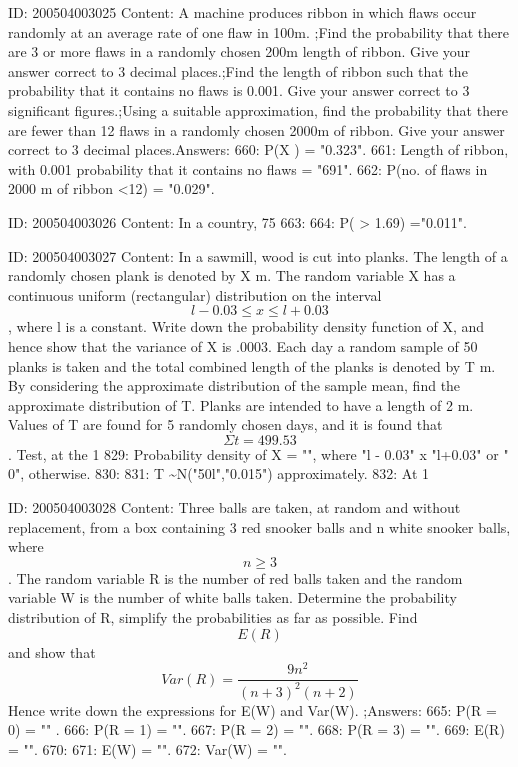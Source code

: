 \documentclass{article}
\begin{document}
ID: 200504003025
Content:
A machine produces ribbon in which flaws occur randomly at an average rate of one flaw in 100m. ;Find the probability that there are 3 or more flaws in a randomly chosen 200m length of ribbon. Give your answer correct to 3 decimal places.;Find the length of ribbon such that the probability that it contains no flaws is 0.001. Give your answer correct to 3 significant figures.;Using a suitable approximation, find the probability that there are fewer than 12 flaws in a randomly chosen 2000m of ribbon. Give your answer correct to 3 decimal places.Answers:
660: P(X ) = "0.323".
661: Length of ribbon, with 0.001 probability that it contains no flaws = "691".
662: P(no. of flaws in 2000 m of ribbon <12) = "0.029".

ID: 200504003026
Content:
In a country, 75%
663: 
664: P( > 1.69) ="0.011".

ID: 200504003027
Content:
In a sawmill, wood is cut into planks. The length of a randomly chosen plank is denoted by X m. The random variable X has a continuous uniform (rectangular) distribution on the interval $$l - 0.03 \leq x \leq l + 0.03$$, where l is a constant. Write down the probability density function of X, and hence show that the variance of X is .0003. Each day a random sample of 50 planks is taken and the total combined length of the planks is denoted by T m. By considering the approximate distribution of the sample mean, find the approximate distribution of T. Planks are intended to have a length of 2 m. Values of T are found for 5 randomly chosen days, and it is found that $$\Sigma t = 499.53$$. Test, at the 1%
829: Probability density of X = "", where "l - 0.03" \leq x \leq "l+0.03" or " 0", otherwise.
830: 
831: T \sim N("50l","0.015") approximately.
832: At 1%

ID: 200504003028
Content:
Three balls are taken, at random and without replacement, from a box containing 3 red snooker balls and n white snooker balls, where $$n \geq 3$$. The random variable R is the number of red balls taken and the random variable W is the number of white balls taken. Determine the probability distribution of R, simplify the probabilities as far as possible. Find $$E(R)$$ and show that $$Var\left(R\right) = \frac{9 n^2}{{\left(n + 3\right)}^2 \left(n + 2\right)}$$ Hence write down the expressions for E(W) and Var(W). ;Answers:
665: P(R = 0) = "" .
666: P(R = 1) = "".
667: P(R = 2) = "".
668: P(R = 3) = "".
669: E(R) = "".
670: 
671: E(W) = "".
672: Var(W) = "".
\end{document}
